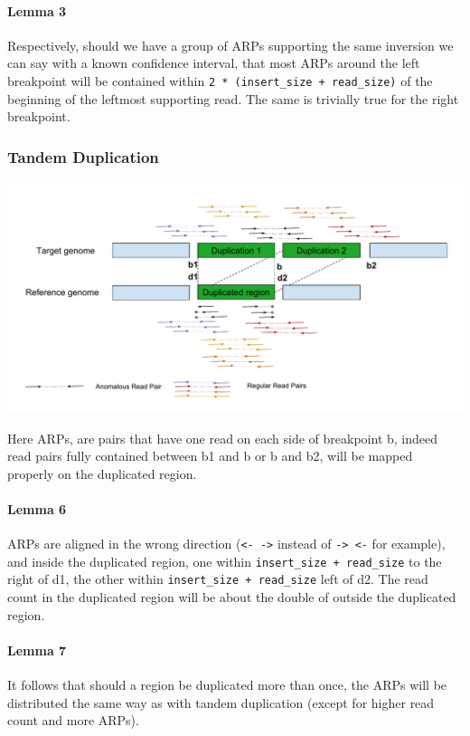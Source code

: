 \documentclass{article}
\begin{document}
\paragraph{Lemma 3} Respectively, should we have a group of ARPs supporting the same inversion we can say with a known confidence interval, that most ARPs around the left breakpoint will be contained within \verb|2 * (insert_size + read_size)| of the beginning of the leftmost supporting read. The same is trivially true for the right breakpoint.

\subsubsection{Tandem Duplication}

\includegraphics[width=\textwidth]{DuplicationReadPairs}

Here ARPs, are pairs that have one read on each side of breakpoint b, indeed
read pairs fully contained between b1 and b or b and b2, will be mapped properly on the
duplicated region.

\paragraph{Lemma 6} ARPs are aligned in the wrong direction (\verb|<- ->| instead of \verb|-> <-| for example), and inside the duplicated region, one within \verb|insert_size + read_size| to the right of d1, the other within \verb|insert_size + read_size| left of d2.
The read count in the duplicated region will be about the double of outside the duplicated region.

\paragraph{Lemma 7} It follows that should a region be duplicated more than once, the ARPs will be distributed the same way as with tandem duplication (except for higher read count and more ARPs).
\end{document}
